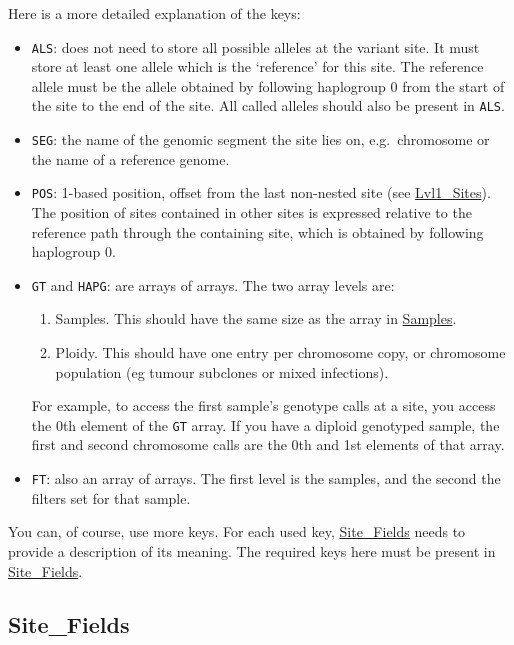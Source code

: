 Here is a more detailed explanation of the keys:

\begin{itemize}
\item
  \texttt{ALS}: does not need to store all possible alleles at the
  variant site. It must store at least one allele which is the
  `reference' for this site. The reference allele must be the allele
  obtained by following haplogroup 0 from the start of the site to the
  end of the site. All called alleles should also be present in
  \texttt{ALS}.
\item
  \texttt{SEG}: the name of the genomic segment the site lies on,
  e.g.~chromosome or the name of a reference genome.
\item
  \texttt{POS}: 1-based position, offset from the last non-nested site
  (see \protect\hyperlink{lvl1_sites}{Lvl1\_Sites}). The position of
  sites contained in other sites is expressed relative to the reference
  path through the containing site, which is obtained by following
  haplogroup 0.
\item
  \texttt{GT} and \texttt{HAPG}: are arrays of arrays. The two array
  levels are:

  \begin{enumerate}
  \def\labelenumi{\arabic{enumi}.}
  \tightlist
  \item
    Samples. This should have the same size as the array in
    \protect\hyperlink{samples}{Samples}.
  \item
    Ploidy. This should have one entry per chromosome copy, or
    chromosome population (eg tumour subclones or mixed infections).
  \end{enumerate}

  For example, to access the first sample's genotype calls at a site,
  you access the 0th element of the \texttt{GT} array. If you have a
  diploid genotyped sample, the first and second chromosome calls are
  the 0th and 1st elements of that array.
\item
  \texttt{FT}: also an array of arrays. The first level is the samples,
  and the second the filters set for that sample.
\end{itemize}

You can, of course, use more keys. For each used key,
\protect\hyperlink{site_fields}{Site\_Fields} needs to provide a
description of its meaning. The required keys here must be present in
\protect\hyperlink{site_fields}{Site\_Fields}.

\hypertarget{site_fields}{%
\subsection{Site\_Fields}\label{site_fields}}

